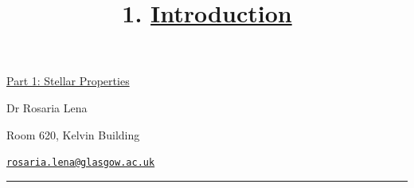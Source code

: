 \documentclass[
  letterpaper,
  DIV=11,
  numbers=noendperiod]{scrreprt}
\title{1. \protect\hyperlink{toc0_}{Introduction}}
\author{}
\date{}
\renewcommand*\contentsname{Table of contents}
\newcommand\contentsname{Table of contents}
\begin{document}
\maketitle
\ifdefined\Shaded\renewenvironment{Shaded}{\begin{tcolorbox}[sharp corners, frame hidden, boxrule=0pt, interior hidden, breakable, borderline west={3pt}{0pt}{shadecolor}, enhanced]}{\end{tcolorbox}}\fi

\renewcommand*\contentsname{Table of contents}
{
\hypersetup{linkcolor=}
\setcounter{tocdepth}{2}
\tableofcontents
}
\protect\hyperlink{toc0_}{Part 1: Stellar Properties}

Dr Rosaria Lena

Room 620, Kelvin Building

\href{mailto:rosaria.lena@glasgow.ac.uk}{\nolinkurl{rosaria.lena@glasgow.ac.uk}}

\begin{center}\rule{0.5\linewidth}{0.5pt}\end{center}
\end{document}
